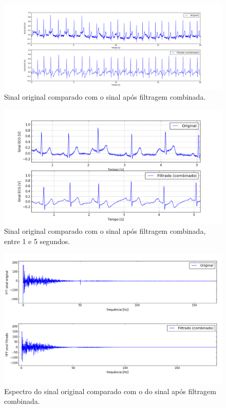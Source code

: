 \documentclass[12pt,letterpaper]{article}
\begin{document}
\begin{enumerate}[label=(\alph*)]
        \begin{figure}[H]
            \centering
            \includegraphics[width=15cm]{TC1/images/Q2d_comb_whole.png}
            \caption{Sinal original comparado com o sinal após filtragem combinada.}
            \label{fig:16}
        \end{figure}
        \begin{figure}[H]
            \centering
            \includegraphics[width=15cm]{TC1/images/Q2d_comb_1-5seg.png}
            \caption{Sinal original comparado com o sinal após filtragem combinada, entre 1 e 5 segundos.}
            \label{fig:17}
        \end{figure}
        \begin{figure}[H]
            \centering
            \includegraphics[width=15cm]{TC1/images/Q2d_comb_espectro_comparado.png}
            \caption{Espectro do sinal original comparado com o do sinal após filtragem combinada.}
            \label{fig:18}
        \end{figure}
    
\end{enumerate}
\end{document}
